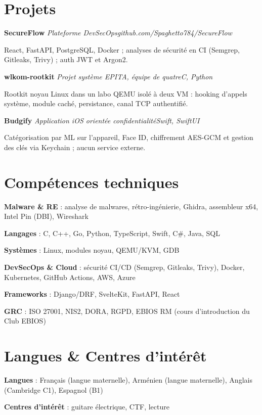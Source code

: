 \documentclass[10pt]{article}
\newcommand{\gap}{\vspace{4pt}}
\begin{document}
\section{Projets}
\textbf{SecureFlow} \textbar{} \textit{Plateforme DevSecOps}\hfill\textit{github.com/Spaghetto784/SecureFlow}\par
React, FastAPI, PostgreSQL, Docker ; analyses de s\'ecurit\'e en CI (Semgrep, Gitleaks, Trivy) ; auth JWT et Argon2.\gap\par
\textbf{wlkom-rootkit} \textbar{} \textit{Projet syst\`eme EPITA, \'equipe de quatre}\hfill\textit{C, Python}\par
Rootkit noyau Linux dans un labo QEMU isol\'e \`a deux VM : hooking d'appels syst\`eme, module cach\'e, persistance, canal TCP authentifi\'e.\gap\par
\textbf{Budgify} \textbar{} \textit{Application iOS orient\'ee confidentialit\'e}\hfill\textit{Swift, SwiftUI}\par
Cat\'egorisation par ML sur l'appareil, Face ID, chiffrement AES-GCM et gestion des cl\'es via Keychain ; aucun service externe.

\section{Comp\'etences techniques}
\textbf{Malware \& RE} : analyse de malwares, r\'etro-ing\'enierie, Ghidra, assembleur x64, Intel Pin (DBI), Wireshark\par
\textbf{Langages} : C, C++, Go, Python, TypeScript, Swift, C\#, Java, SQL\par
\textbf{Syst\`emes} : Linux, modules noyau, QEMU/KVM, GDB\par
\textbf{DevSecOps \& Cloud} : s\'ecurit\'e CI/CD (Semgrep, Gitleaks, Trivy), Docker, Kubernetes, GitHub Actions, AWS, Azure\par
\textbf{Frameworks} : Django/DRF, SvelteKit, FastAPI, React\par
\textbf{GRC} : ISO 27001, NIS2, DORA, RGPD, EBIOS RM (cours d'introduction du Club EBIOS)

\section{Langues \& Centres d'int\'er\^et}
\textbf{Langues} : Fran\c{c}ais (langue maternelle), Arm\'enien (langue maternelle), Anglais (Cambridge C1), Espagnol (B1)\par
\textbf{Centres d'int\'er\^et} : guitare \'electrique, CTF, lecture
\end{document}
